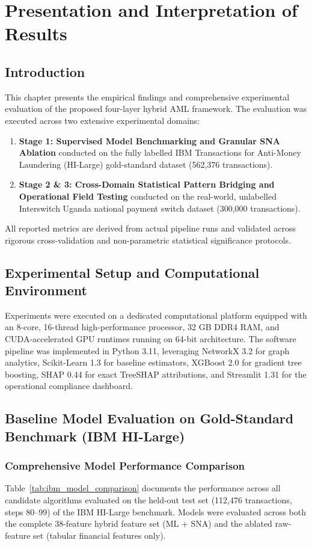 \chapter{Presentation and Interpretation of Results} \label{ch:results}

\section{Introduction}
This chapter presents the empirical findings and comprehensive experimental evaluation of the proposed four-layer hybrid AML framework. The evaluation was executed across two extensive experimental domains:
\begin{enumerate}
    \item \textbf{Stage 1: Supervised Model Benchmarking and Granular SNA Ablation} conducted on the fully labelled IBM Transactions for Anti-Money Laundering (HI-Large) gold-standard dataset (562,376 transactions).
    \item \textbf{Stage 2 \& 3: Cross-Domain Statistical Pattern Bridging and Operational Field Testing} conducted on the real-world, unlabelled Interswitch Uganda national payment switch dataset (300,000 transactions).
\end{enumerate}
All reported metrics are derived from actual pipeline runs and validated across rigorous cross-validation and non-parametric statistical significance protocols.

\section{Experimental Setup and Computational Environment}
Experiments were executed on a dedicated computational platform equipped with an 8-core, 16-thread high-performance processor, 32 GB DDR4 RAM, and CUDA-accelerated GPU runtimes running on 64-bit architecture. The software pipeline was implemented in Python 3.11, leveraging NetworkX 3.2 for graph analytics, Scikit-Learn 1.3 for baseline estimators, XGBoost 2.0 for gradient tree boosting, SHAP 0.44 for exact TreeSHAP attributions, and Streamlit 1.31 for the operational compliance dashboard.

\section{Baseline Model Evaluation on Gold-Standard Benchmark (IBM HI-Large)}
\subsection{Comprehensive Model Performance Comparison}
Table~\ref{tab:ibm_model_comparison} documents the performance across all candidate algorithms evaluated on the held-out test set (112,476 transactions, steps 80--99) of the IBM HI-Large benchmark. Models were evaluated across both the complete 38-feature hybrid feature set (ML + SNA) and the ablated raw-feature set (tabular financial features only).


